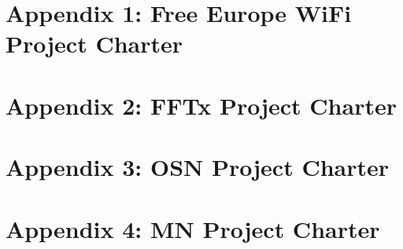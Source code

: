 \documentclass[draftclsnofoot,12pt,journal,onecolumn]{IEEEtran}
\begin{document}


% 








\appendices

\section{Appendix 1: Free Europe WiFi Project Charter}



\section{Appendix 2: FFTx Project Charter}


\section{Appendix 3: OSN Project Charter}


\section{Appendix 4: MN Project Charter}


\end{document}
